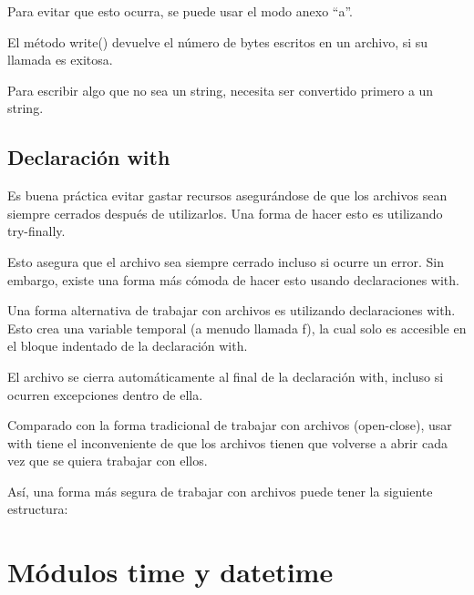 \documentclass{report}
\newcommand{\doble}[1]{``#1''}
\begin{document}
{

Para evitar que esto ocurra, se puede usar el modo anexo \doble{a}.


El método write() devuelve el número de bytes escritos en un archivo, si su llamada es exitosa.


Para escribir algo que no sea un string, necesita ser convertido primero a un string.


\section{Declaración with}

Es buena práctica evitar gastar recursos asegurándose de que los archivos sean siempre cerrados después de utilizarlos. Una forma de hacer esto es utilizando try-finally.


Esto asegura que el archivo sea siempre cerrado incluso si ocurre un error.
Sin embargo, existe una forma más cómoda de hacer esto usando declaraciones with.

Una forma alternativa de trabajar con archivos es utilizando declaraciones with. Esto crea una variable temporal (a menudo llamada f), la cual solo es accesible en el bloque indentado de la declaración with.


El archivo se cierra automáticamente al final de la declaración with, incluso si ocurren excepciones dentro de ella.

Comparado con la forma tradicional de trabajar con archivos (open-close), usar with tiene el inconveniente de que los archivos tienen que volverse a abrir cada vez que se quiera trabajar con ellos.

Así, una forma más segura de trabajar con archivos puede tener la siguiente estructura:


\clearpage\chapter{Módulos time y datetime}

}
\end{document}
